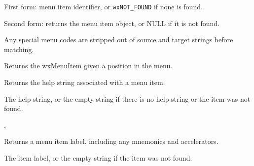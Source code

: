 

First form: menu item identifier, or {\tt wxNOT\_FOUND} if none is found.

Second form: returns the menu item object, or NULL if it is not found.


Any special menu codes are stripped out of source and target strings
before matching.



\label{wxmenufinditembyposition}


Returns the wxMenuItem given a position in the menu.


\label{wxmenugethelpstring}


Returns the help string associated with a menu item.




The help string, or the empty string if there is no help string or the
item was not found.


, 


\label{wxmenugetlabel}


Returns a menu item label, including any mnemonics and accelerators.




The item label, or the empty string if the item was not found.


